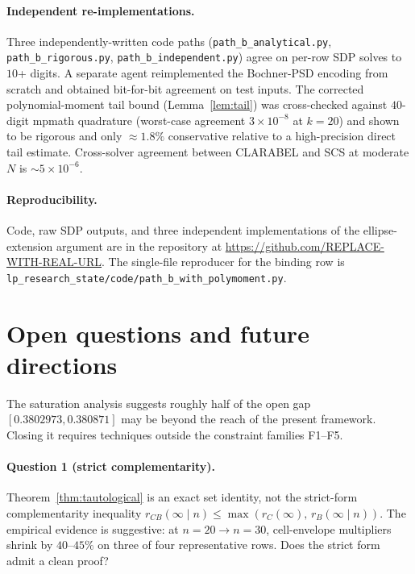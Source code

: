 \documentclass[11pt]{article}
\theoremstyle{plain}
\theoremstyle{definition}
\begin{document}
\paragraph{Independent re-implementations.} Three independently-written
code paths (\texttt{path\_b\_analytical.py}, \texttt{path\_b\_rigorous.py},
\texttt{path\_b\_independent.py}) agree on per-row SDP solves to $10$+
digits. A separate agent reimplemented the Bochner-PSD encoding from
scratch and obtained bit-for-bit agreement on test inputs. The
corrected polynomial-moment tail bound (Lemma~\ref{lem:tail}) was
cross-checked against $40$-digit mpmath quadrature (worst-case
agreement $3\times 10^{-8}$ at $k=20$) and shown to be rigorous and
only $\approx 1.8\%$ conservative relative to a high-precision direct
tail estimate. Cross-solver agreement between CLARABEL and SCS at
moderate $N$ is $\sim 5 \times 10^{-6}$.

\paragraph{Reproducibility.}
Code, raw SDP outputs, and three independent implementations of the
ellipse-extension argument are in the repository at
\url{https://github.com/REPLACE-WITH-REAL-URL}.
The single-file reproducer for the binding row is
\texttt{lp\_research\_state/code/path\_b\_with\_polymoment.py}.

\section{Open questions and future directions}\label{sec:open}

The saturation analysis suggests roughly half of the open gap
$[0.3802973, 0.380871]$ may be beyond the reach of the present
framework. Closing it requires techniques outside the constraint
families F1--F5.

\paragraph{Question 1 (strict complementarity).}
Theorem~\ref{thm:tautological} is an exact set identity, not the
strict-form complementarity inequality
$r_{CB}(\infty \mid n) \le \max(r_C(\infty),\, r_B(\infty \mid n))$.
The empirical evidence is suggestive: at $n = 20 \to n = 30$,
cell-envelope multipliers shrink by $40$--$45\%$ on three of four
representative rows. Does the strict form admit a clean proof?
\end{document}
